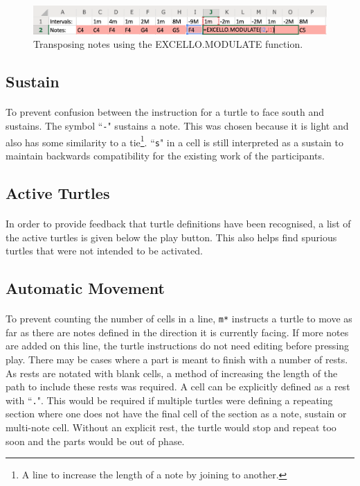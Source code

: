 \begin{figure}[tbh]
\centerline{\includegraphics[width=150mm]{figs/modulateFunction.png}}
\caption{Transposing notes using the EXCELLO.MODULATE function.}
\label{implementation:modulateFunction}
\end{figure}


\subsection{Sustain}

\paragraph{} To prevent confusion between the instruction for a turtle to face south and sustains. The symbol ``\texttt{-}" sustains a note. This was chosen because it is light and also has some similarity to a tie\footnote{A line to increase the length of a note by joining to another.}. ``\texttt{s}" in a cell is still interpreted as a sustain to maintain backwards compatibility for the existing work of the participants.

\subsection{Active Turtles}

\paragraph{} In order to provide feedback that turtle definitions have been recognised, a list of the active turtles is given below the play button. This also helps find spurious turtles that were not intended to be activated.

\subsection{Automatic Movement}

\paragraph{} To prevent counting the number of cells in a line, \texttt{m*} instructs a turtle to move as far as there are notes defined in the direction it is currently facing. If more notes are added on this line, the turtle instructions do not need editing before pressing play. There may be cases where a part is meant to finish with a number of rests. As rests are notated with blank cells, a method of increasing the length of the path to include these rests was required. A cell can be explicitly defined as a rest with ``\texttt{.}". This would be required if multiple turtles were defining a repeating section where one does not have the final cell of the section as a note, sustain or multi-note cell. Without an explicit rest, the turtle would stop and repeat too soon and the parts would be out of phase.

